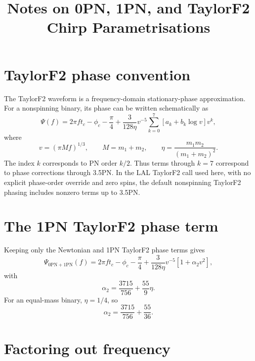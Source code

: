 \documentclass[11pt]{article}
\title{Notes on 0PN, 1PN, and TaylorF2 Chirp Parametrisations}
\author{}
\date{}
\begin{document}
\maketitle

\section{TaylorF2 phase convention}

The TaylorF2 waveform is a frequency-domain stationary-phase approximation.
For a nonspinning binary, its phase can be written schematically as
\begin{equation}
    \Psi(f)
    = 2\pi f t_c - \phi_c - \frac{\pi}{4}
    + \frac{3}{128\eta} v^{-5}
      \sum_{k=0}^{7}
      \left[a_k + b_k \log v\right] v^k ,
    \label{eq:taylorf2_phase}
\end{equation}
where
\begin{equation}
    v = (\pi M f)^{1/3}, \qquad
    M = m_1 + m_2, \qquad
    \eta = \frac{m_1 m_2}{(m_1 + m_2)^2}.
\end{equation}
The index $k$ corresponds to PN order $k/2$. Thus terms through $k=7$
correspond to phase corrections through 3.5PN. In the LAL TaylorF2 call used
here, with no explicit phase-order override and zero spins, the default
nonspinning TaylorF2 phasing includes nonzero terms up to 3.5PN.

\section{The 1PN TaylorF2 phase term}

Keeping only the Newtonian and 1PN TaylorF2 phase terms gives
\begin{equation}
    \Psi_{\mathrm{0PN+1PN}}(f)
    =
    2\pi f t_c - \phi_c - \frac{\pi}{4}
    + \frac{3}{128\eta} v^{-5}
      \left[
        1 + \alpha_2 v^2
      \right],
    \label{eq:taylorf2_1pn}
\end{equation}
with
\begin{equation}
    \alpha_2 = \frac{3715}{756} + \frac{55}{9}\eta .
\end{equation}
For an equal-mass binary, $\eta = 1/4$, so
\begin{equation}
    \alpha_2 = \frac{3715}{756} + \frac{55}{36}.
\end{equation}

\section{Factoring out frequency}
\end{document}
